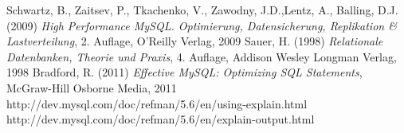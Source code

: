 \newpage
{}
  \begin{thebibliography}{}



     Schwartz, B., Zaitsev, P., Tkachenko, V., Zawodny, J.D.,Lentz, A., Balling, D.J. (2009) 
        {\sl High Performance MySQL. Optimierung, Datensicherung, Replikation \& Lastverteilung}, 2. Auflage,  O'Reilly Verlag, 2009
     Sauer, H. (1998) {\sl Relationale Datenbanken, Theorie und Praxis}, 4. Auflage, Addison Wesley Longman Verlag, 1998
     Bradford, R. (2011) {\sl Effective MySQL: Optimizing SQL Statements}, McGraw-Hill Osborne Media, 2011
     http://dev.mysql.com/doc/refman/5.6/en/using-explain.html
     http://dev.mysql.com/doc/refman/5.6/en/explain-output.html

  \end{thebibliography}

 